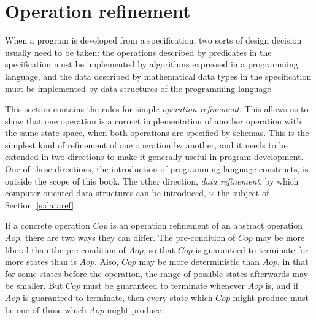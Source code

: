\section{Operation refinement}

When a program is developed from a specification, two sorts of design
decision usually need to be taken: the operations described by
predicates in the specification must be implemented by algorithms
expressed in a programming language, and the data described by
mathematical data types in the specification must be implemented by
data structures of the programming language.

This section contains the rules for simple {\em operation
refinement}.%
This allows us to show that one operation is a
correct implementation of another operation with the same state space,
when both operations are specified by schemas.  This is the simplest
kind of refinement of one operation by another, and it needs to be
extended in two directions to make it generally useful in program
development. One of these directions, the introduction of programming
language constructs, is outside the scope of this book. The other
direction, {\em data refinement},%
by which computer-oriented data structures can be introduced, is the
subject of Section~\ref{s:dataref}. 

If a concrete operation $Cop$ is an operation refinement of an
abstract operation $Aop$, there are two ways they can differ. The
pre-condition of $Cop$ may be more liberal than the pre-condition of
$Aop$, so that $Cop$ is guaranteed to terminate for more states than
is $Aop$. Also, $Cop$ may be more deterministic than $Aop$, in that
for some states before the operation, the range of possible states
afterwards may be smaller.  But $Cop$ must be guaranteed to terminate
whenever $Aop$ is, and if $Aop$ is guaranteed to terminate, then every
state which $Cop$ might produce must be one of those which $Aop$ might
produce.

